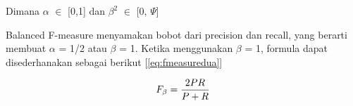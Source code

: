 Dimana $\alpha$ $\in$ [0,1] dan $\beta^2$ $\in$ [0, $\Psi$]

Balanced F-measure menyamakan bobot dari precision dan recall, yang berarti membuat $\alpha$ = 1/2 atau $\beta$ = 1. Ketika menggunakan $\beta$ = 1, formula dapat disederhanakan sebagai berikut  [\ref{eq:fmeasuredua}]

\begin{equation}
\begin{split}
\tiny
F_\beta = \frac{2PR}{P + R}
\label{eq:fmeasuredua}
\normalsize
\end{split}
\end{equation}
